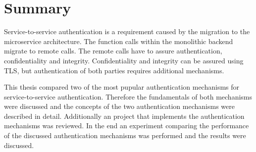 \section{Summary}
Service-to-service authentication is a requirement caused by the migration to the microservice architecture.
The function calls within the monolithic backend migrate to remote calls.
The remote calls have to assure authentication, confidentiality and integrity.
Confidentiality and integrity can be assured using TLS, but authentication of both parties requires additional mechanisms.

This thesis compared two of the most pupular authentication mechanisms for service-to-service authentication.
Therefore the fundamentals of both mechanisms were discussed and the concepts of the two authentication mechanisms were described in detail.
Additionally an project that implements the authentication mechanisms was reviewed. 
In the end an experiment comparing the performance of the discussed authentication mechanisms was performed and the results were discussed.


